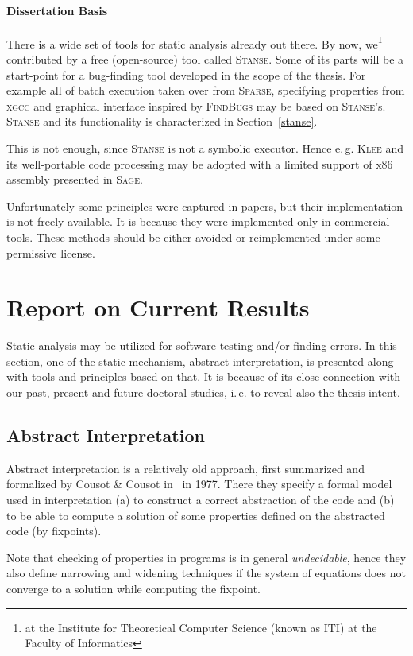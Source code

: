 \documentclass[11pt,a4paper]{article}
\newcommand{\stan}{\textsc{Stanse}\xspace}
\begin{document}
\paragraph{Dissertation Basis} There is a wide set of tools for static
analysis already out there. By now, we\footnote{at the Institute for
Theoretical Computer Science (known as ITI) at the Faculty of Informatics}
contributed by a free (open-source) tool called \stan. Some of its parts will
be a start-point for a bug-finding tool developed in the scope of the thesis.
For example all of batch execution taken over from \textsc{Sparse}, specifying
properties from \textsc{xgcc} and graphical interface inspired by
\textsc{FindBugs} may be based on \stan's. \stan and its functionality
is characterized in Section~\ref{stanse}.

This is not enough, since \stan is not a symbolic executor. Hence e.\,g.
\textsc{Klee} and its well-portable code processing may be adopted with a
limited support of x86 assembly presented in \textsc{Sage}.

Unfortunately some principles were captured in papers, but their
implementation is not freely available. It is because they were implemented
only in commercial tools. These methods should be either avoided or
reimplemented under some permissive license.

\newpage

\section{Report on Current Results}
Static analysis may be utilized for software testing and/or finding errors.
In this section, one of the static mechanism, abstract interpretation, is
presented along with tools and principles based on that. It is because of its
close connection with our past, present and future doctoral studies, i.\,e. to
reveal also the thesis intent.

\subsection{Abstract Interpretation}
\label{cousot}
Abstract interpretation is a relatively old approach, first summarized and
formalized by Cousot \& Cousot in~\cite{cousot} in 1977. There they specify a
formal model used in interpretation (a) to construct a correct abstraction of
the code and (b) to be able to compute a solution of some properties defined
on the abstracted code (by fixpoints).

Note that checking of properties in programs is in general \emph{undecidable},
hence they also define narrowing and widening techniques if the system of
equations does not converge to a solution while computing the fixpoint.
\end{document}
